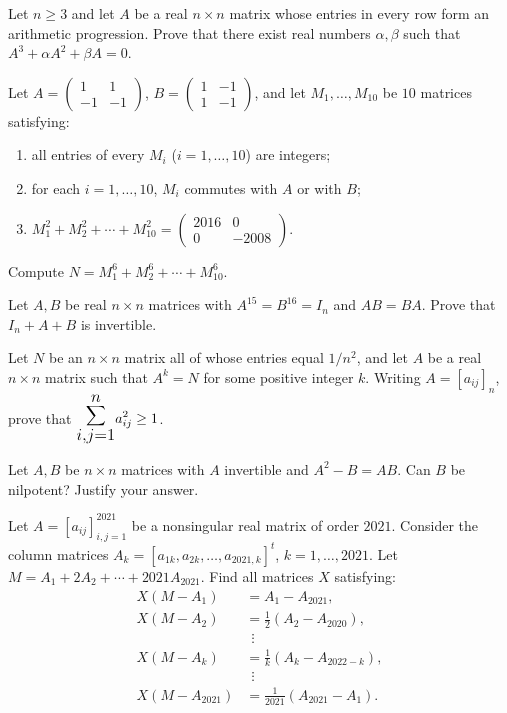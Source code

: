 \documentclass[12pt]{article}
\let\oldsum\sum
\renewcommand{\sum}{\mathlarger{\mathlarger{\oldsum}}}
\begin{document}
\begin{problem}
Let $n \geq 3$ and let $A$ be a real $n\times n$ matrix whose entries in every row form an arithmetic progression. Prove that there exist real numbers $\alpha,\beta$ such that $A^3+\alpha A^2+\beta A = 0$.
\end{problem}

\begin{problem}
Let $A=\begin{pmatrix}1&1\\-1&-1\end{pmatrix}$, $B=\begin{pmatrix}1&-1\\1&-1\end{pmatrix}$, and let $M_1,\dots,M_{10}$ be $10$ matrices satisfying:
\begin{enumerate}[label=\roman*)]
\item all entries of every $M_i$ ($i=1,\dots,10$) are integers;
\item for each $i=1,\dots,10$, $M_i$ commutes with $A$ or with $B$;
\item $M_1^2+M_2^2+\cdots+M_{10}^2 = \begin{pmatrix}2016 & 0\\ 0 & -2008\end{pmatrix}$.
\end{enumerate}
Compute $N = M_1^6+M_2^6+\cdots+M_{10}^6$.
\end{problem}

\begin{problem}
Let $A,B$ be real $n\times n$ matrices with $A^{15}=B^{16}=I_n$ and $AB=BA$. Prove that $I_n+A+B$ is invertible.
\end{problem}

\begin{problem}
Let $N$ be an $n\times n$ matrix all of whose entries equal $1/n^2$, and let $A$ be a real $n\times n$ matrix such that $A^k = N$ for some positive integer $k$. Writing $A=[a_{ij}]_n$, prove that $\displaystyle\sum_{i,j=1}^n a_{ij}^2 \geq 1$.
\end{problem}

\begin{problem}
Let $A,B$ be $n\times n$ matrices with $A$ invertible and $A^2-B=AB$. Can $B$ be nilpotent? Justify your answer.
\end{problem}

\begin{problem}
Let $A=[a_{ij}]_{i,j=1}^{2021}$ be a nonsingular real matrix of order $2021$. Consider the column matrices $A_k=[a_{1k},a_{2k},\dots,a_{2021,k}]^t$, $k=1,\dots,2021$. Let $M=A_1+2A_2+\cdots+2021A_{2021}$. Find all matrices $X$ satisfying:
\[
\begin{aligned}
X(M-A_1) &= A_1-A_{2021},\\
X(M-A_2) &= \tfrac{1}{2}(A_2-A_{2020}),\\
&\ \ \vdots\\
X(M-A_k) &= \tfrac{1}{k}(A_k-A_{2022-k}),\\
&\ \ \vdots\\
X(M-A_{2021}) &= \tfrac{1}{2021}(A_{2021}-A_1).
\end{aligned}
\]
\end{problem}
\end{document}
